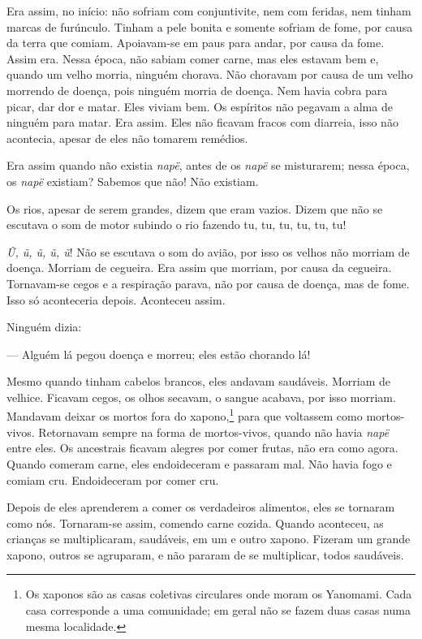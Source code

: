 Era assim, no início: não sofriam com conjuntivite, nem com feridas, nem
tinham marcas de furúnculo. Tinham a pele bonita e somente sofriam de
fome, por causa da terra que comiam. Apoiavam-se em paus para andar, por
causa da fome. Assim era. Nessa época, não sabiam comer carne, mas eles
estavam bem e, quando um velho morria, ninguém chorava. Não choravam por
causa de um velho morrendo de doença, pois ninguém morria de doença. Nem
havia cobra para picar, dar dor e matar. Eles viviam bem. Os espíritos
não pegavam a alma de ninguém para matar. Era assim. Eles não ficavam
fracos com diarreia, isso não acontecia, apesar de eles não tomarem
remédios. 

Era assim quando não existia \textit{napë}, antes de os \textit{napë} se
misturarem; nessa época, os \textit{napë} existiam? Sabemos que não! Não
existiam. 

Os rios, apesar de serem grandes, dizem que eram vazios. Dizem que não
se escutava o som de motor subindo o rio fazendo tu, tu, tu, tu, tu,
tu!

\textit{Ũ, ũ, ũ, ũ, ũ}! Não se escutava o som do avião, por isso os velhos
não morriam de doença. Morriam de cegueira. Era assim que morriam, por
causa da cegueira. Tornavam-se cegos e a respiração parava, não por
causa de doença, mas de fome. Isso só aconteceria depois. Aconteceu
assim. 

Ninguém dizia:

--- Alguém lá pegou doença e morreu; eles estão chorando lá! 

Mesmo quando tinham cabelos brancos, eles andavam saudáveis. Morriam de
velhice. Ficavam cegos, os olhos secavam, o sangue acabava, por isso
morriam. Mandavam deixar os mortos fora do xapono,\footnote{Os xaponos são as 
casas coletivas circulares onde moram os Yanomami. Cada casa corresponde a 
uma comunidade; em geral não se fazem duas casas numa mesma localidade.} para que voltassem
como mortos-vivos. Retornavam sempre na forma de
mortos-vivos, quando não havia \textit{napë} entre eles. Os ancestrais
ficavam alegres por comer frutas, não era como agora. Quando comeram
carne, eles endoideceram e passaram mal. Não havia fogo e comiam cru.
Endoideceram por comer cru.

Depois de eles aprenderem a comer os verdadeiros alimentos, eles se
tornaram como nós. Tornaram-se assim, comendo carne cozida. Quando
aconteceu, as crianças se multiplicaram, saudáveis, em um e outro
xapono. Fizeram um grande xapono, outros se agruparam, e não
pararam de se multiplicar, todos saudáveis.

